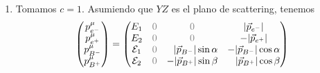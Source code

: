 \documentclass[]{report}
\numberwithin{equation}{section}
\newcommand{\0}{\textcolor{gray}{0}}
\begin{document}
\begin{enumerate}
	\item[a)] Tomamos \(c = 1\). Asumiendo que \(YZ\) es el plano de scattering, tenemos
	\begin{equation}
		\begin{pmatrix}
			p^{\mu}_{e^{-}}\\
			p^{\mu}_{e^{+}}\\
			p^{\mu}_{B^{-}}\\
			p^{\mu}_{B^{+}}
		\end{pmatrix} = \begin{pmatrix}
			E_{1} 			& \0 & \0 								& |\vec{p}_{e^{-}}|\\
			E_{2} 			& \0 & \0 								& -|\vec{p}_{e^{+}}|\\
			\mathcal{E}_{1} & \0 & \hfill|\vec{p}_{B^{-}}|\sin\alpha	& -|\vec{p}_{B^{-}}|\cos\alpha\\
			\mathcal{E}_{2} & \0 & -|\vec{p}_{B^{+}}|\sin\beta 		& \hfill|\vec{p}_{B^{+}}|\cos\beta
		\end{pmatrix}
	\end{equation}
	

\end{enumerate}
\end{document}
